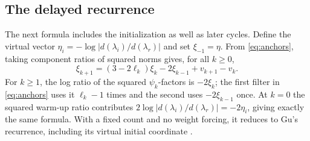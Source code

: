 \documentclass[11pt,a4paper]{article}
\numberwithin{equation}{section}
\newcommand{\abs}[1]{\lvert#1\rvert}
\begin{document}
\subsection{The delayed recurrence}
The next formula includes the initialization as well as later cycles.
Define the virtual vector \(\eta_i=-\log\abs{d(\lambda_i)/d(\lambda_r)}\) and set \(\xi_{-1}=\eta\). From \eqref{eq:anchors}, taking component ratios of squared norms gives, for all \(k\ge0\),
\begin{equation}\label{eq:forced}
 \xi_{k+1}=(3-2\ell_k)\xi_k-2\xi_{k-1}+v_{k+1}-v_k .
\end{equation}
For \(k\ge1\), the log ratio of the squared \(\psi_k\)-factors is \(-2\xi_k\); the first filter in \eqref{eq:anchors} uses it \(\ell_k-1\) times and the second uses \(-2\xi_{k-1}\) once. At \(k=0\) the squared warm-up ratio contributes \(2\log\abs{d(\lambda_i)/d(\lambda_r)}=-2\eta_i\), giving exactly the same formula. With a fixed count and no weight forcing, it reduces to Gu's recurrence, including its virtual initial coordinate \cite[Lemma~3.1]{Gu}.
\end{document}
